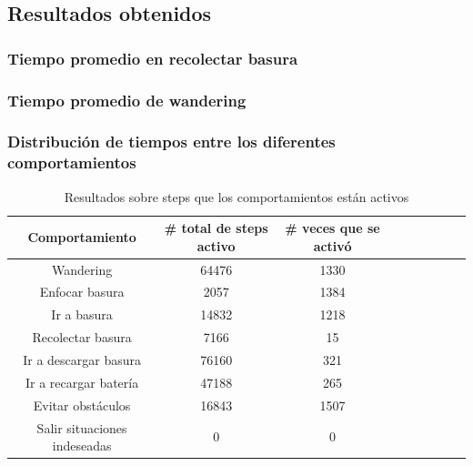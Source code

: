 \newpage
\subsection{Resultados obtenidos}
\label{results}

\subsubsection{Tiempo promedio en recolectar basura}

\subsubsection{Tiempo promedio de wandering}

\subsubsection{Distribuci\'on de tiempos entre los diferentes comportamientos}

\begin{table}[ht]
	\begin{center}
		\begin{tabular}{|c|c|c|c|c|c|c|c|c|}
			\hline
			Comportamiento & \# total de steps activo & \# veces que se activ\'o \\
			\hline
			Wandering & 64476 & 1330 \\
			Enfocar basura & 2057 & 1384 \\
			Ir a basura & 14832 & 1218 \\
			Recolectar basura & 7166 & 15 \\
			Ir a descargar basura & 76160 & 321 \\
			Ir a recargar bater\'ia & 47188 & 265 \\
			Evitar obst\'aculos & 16843 & 1507 \\
			Salir situaciones indeseadas & 0 & 0 \\
			\hline
		\end{tabular}
	\end{center}
	\caption{Resultados sobre steps que los comportamientos est\'an activos }
	\label{behaviours_stats}
\end{table}

